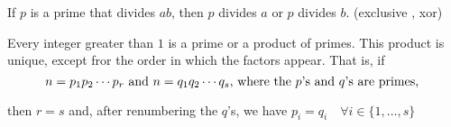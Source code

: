 \begin{thm-non}
  If $p$ is a prime that divides $ab$, then $p$ divides $a$ or $p$ divides $b$. (exclusive , xor)
\end{thm-non}

\begin{thm}
  Every integer greater than $1$ is a prime or a product of primes. This product is unique, except fror the order in which the factors appear. That is, if
  \begin{equation}
    n = p_1 p_2 \cdots p_r $ and $ n= q_1 q_2 \cdots q_s, $ where the $p$'s and $q$'s are primes, $
  \end{equation}

   then $r=s$ and, after renumbering the $q$'s, we have $p_i = q_i \quad \forall i \in \{1, \ldots, s\}$
\end{thm}